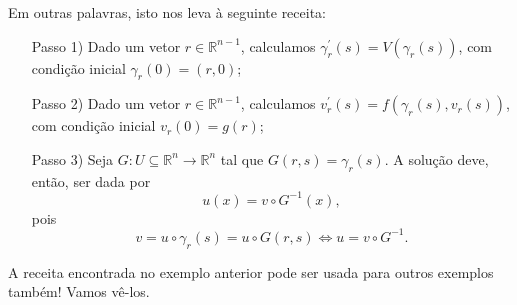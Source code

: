 \documentclass[../pde_notes.tex]{subfiles}
\begin{document}
\begin{example}
	Em outras palavras, isto nos leva à seguinte receita:
	\hypertarget{recipe}{\begin{itemize}
			\item[Passo 1)] Dado um vetor \(r\in \mathbb{R}^{n-1}\), calculamos \(\gamma_{r}^{'}(s)=V(\gamma_{r}(s))\), com condição inicial \(\gamma_{r}(0) = (r, 0)\);
			\item[Passo 2)] Dado um vetor \(r\in \mathbb{R}^{n-1}\), calculamos \(v_{r}^{'}(s)=f(\gamma_{r}(s), v_{r}(s))\), com condição inicial \(v_{r}(0) = g(r)\);
			\item[Passo 3)] Seja \(G:U\subseteq \mathbb{R}^{n}\rightarrow \mathbb{R}^{n}\) tal que \(G(r, s) = \gamma_{r}(s)\). A solução deve, então, ser dada por
			      \[
				      u(x) = v\circ G^{-1}(x),
			      \]
			      pois
			      \[
				      v = u\circ \gamma_{r}(s) = u\circ G(r, s) \Longleftrightarrow u = v\circ G^{-1}.
			      \]
		\end{itemize}}
\end{example}
A receita encontrada no exemplo anterior pode ser usada para outros exemplos também! Vamos vê-los.
\end{document}
